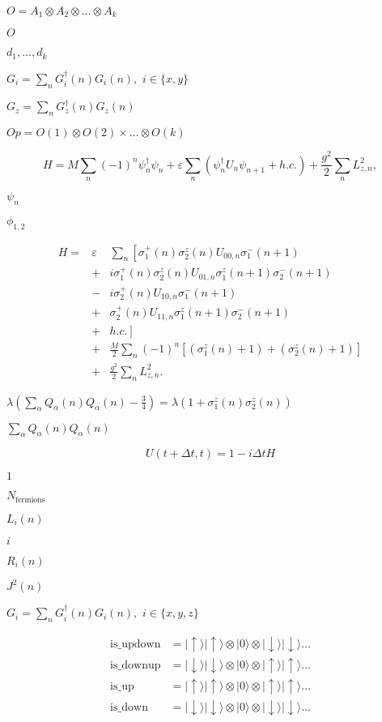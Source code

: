 \documentclass{article}
\begin{document}
{$ O= A_1\otimes A_2 \otimes \dots \otimes A_k $
\pagebreak

$ O $
\pagebreak

$ d_1,\dots,d_k $
\pagebreak

$ G_i=\sum_nG^\dagger_i(n)G_i(n),\,\, i\in\{x,y\}$
\pagebreak

$ G_z=\sum_nG^\dagger_z(n)G_z(n)$
\pagebreak

$ Op=O(1)\otimes O(2) \times \dots \otimes O(k) $
\pagebreak

\[ H = M\sum_n (-1)^n\psi_n^\dagger\psi_n + \varepsilon\sum_n \left(\psi_n^\dagger U_{n}\psi_{n+1}+h.c.\right)+\frac{g^2}{2}\sum_n L_{z,n}^2,\]
\pagebreak

$ \psi_n $
\pagebreak

$ \phi_{1,2}$
\pagebreak

\begin{eqnarray*} H = &\varepsilon &\sum_n\left[\sigma^+_1(n)\sigma^z_2(n) U_{00,n}\sigma_{1}^-(n+1)\right.\\ &+& i\sigma^+_1(n)\sigma^z_2(n) U_{01,n}\sigma_{1}^z(n+1)\sigma_{2}^-(n+1)\\ &-&i \sigma^+_2(n) U_{10,n}\sigma_{1}^-(n+1)\\ &+& \sigma^+_2(n) U_{11,n}\sigma_{1}^z(n+1)\sigma_{2}^-(n+1)\\ &+& \left.h.c.\right]\\ &+&\frac{M}{2}\sum_n(-1)^n\left[ (\sigma^z_{1}(n)+1)+(\sigma^z_{2}(n)+1)\right] \\ &+&\frac{g^2}{2} \sum_n L_{z,n}^2. \end{eqnarray*}
\pagebreak

$ \lambda\left(\sum_\alpha Q_\alpha(n) Q_\alpha(n) - \frac{3}{4}\right) = \lambda\left(1+\sigma^z_{1}(n)\sigma^z_{2}(n)\right) $
\pagebreak

$ \sum_\alpha Q_\alpha(n) Q_\alpha(n) $
\pagebreak

\[U(t+\Delta t,t)=1-i\Delta t H\]
\pagebreak

$ 1 $
\pagebreak

$ N_\mathrm{fermions}$
\pagebreak

$ L_i(n)$
\pagebreak

$ i $
\pagebreak

$ R_i(n)$
\pagebreak

$ J^2(n)$
\pagebreak

$ G_i=\sum_nG^\dagger_i(n)G_i(n),\,\, i\in\{x,y,z\}$
\pagebreak

\begin{eqnarray*} \mathrm{is\_updown} &= |\uparrow\rangle |\uparrow\rangle \otimes |0\rangle\otimes |\downarrow\rangle|\downarrow\rangle\dots\\ \mathrm{is\_downup} &= |\downarrow\rangle|\downarrow\rangle\otimes |0\rangle\otimes|\uparrow\rangle |\uparrow\rangle \dots\\ \mathrm{is\_up} &= |\uparrow\rangle|\uparrow\rangle\otimes |0\rangle\otimes|\uparrow\rangle |\uparrow\rangle \dots\\ \mathrm{is\_down} &= |\downarrow\rangle|\downarrow\rangle\otimes |0\rangle\otimes|\downarrow\rangle |\downarrow\rangle \dots\\ \end{eqnarray*}
\pagebreak

}
\end{document}
